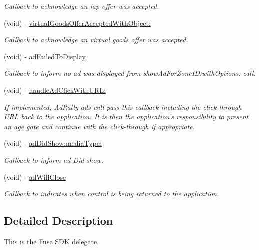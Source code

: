 \begin{DoxyCompactItemize}
\begin{DoxyCompactList}\small\item\em Callback to acknowledge an iap offer was accepted. \end{DoxyCompactList}\item 
(void) -\/ \hyperlink{protocol_fuse_delegate-p_a9577824db67c469466bd720d0193273d}{virtual\+Goods\+Offer\+Accepted\+With\+Object\+:}
\begin{DoxyCompactList}\small\item\em Callback to acknowledge an virtual goods offer was accepted. \end{DoxyCompactList}\item 
(void) -\/ \hyperlink{protocol_fuse_delegate-p_a1513d7db889fcaa54d7248f441b74072}{ad\+Failed\+To\+Display}
\begin{DoxyCompactList}\small\item\em Callback to inform no ad was displayed from show\+Ad\+For\+Zone\+I\+D\+:with\+Options\+: call. \end{DoxyCompactList}\item 
(void) -\/ \hyperlink{protocol_fuse_delegate-p_a2d725902d1f6c4c19d3ce3b65d60052b}{handle\+Ad\+Click\+With\+U\+R\+L\+:}
\begin{DoxyCompactList}\small\item\em If implemented, Ad\+Rally ads will pass this callback including the click-\/through U\+R\+L back to the application. It is then the application's responsibility to present an age gate and continue with the click-\/through if appropriate. \end{DoxyCompactList}\item 
(void) -\/ \hyperlink{protocol_fuse_delegate-p_a88bd02eb971260468ac6f6052bdda28f}{ad\+Did\+Show\+:media\+Type\+:}
\begin{DoxyCompactList}\small\item\em Callback to inform ad Did show. \end{DoxyCompactList}\item 
(void) -\/ \hyperlink{protocol_fuse_delegate-p_aafc293cd46be3bd70eeb60971b961a51}{ad\+Will\+Close}
\begin{DoxyCompactList}\small\item\em Callback to indicates when control is being returned to the application. \end{DoxyCompactList}\end{DoxyCompactItemize}


\subsection{Detailed Description}
This is the Fuse S\+D\+K delegate. 

